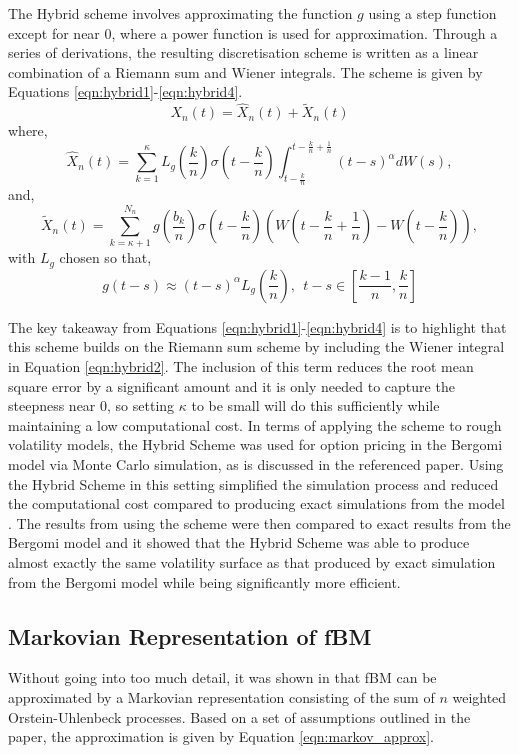 \documentclass[12pt,oneside]{article}
\begin{document}
The Hybrid scheme involves approximating the function $g$ using a step function except for near 0, where a power function is used for approximation. Through a series of derivations, the resulting discretisation scheme is written as a linear combination of a Riemann sum and Wiener integrals. The scheme is given by Equations
\ref{eqn:hybrid1}-\ref{eqn:hybrid4}.  
\begin{equation}
\label{eqn:hybrid1}
X_n(t) = \hat{X}_n(t) + \tilde{X}_n(t)
\end{equation}
where,
\begin{equation}
\label{eqn:hybrid2}
\hat{X}_n(t) = \sum_{k=1}^{\kappa} L_g(\frac{k}{n}) \sigma (t-\frac{k}{n}) \int_{t-\frac{k}{n}}^{t-\frac{k}{n}+\frac{1}{n}}(t-s)^\alpha dW(s),
\end{equation}
and,
\begin{equation}
\label{eqn:hybrid3}
\tilde{X}_n(t)=\sum_{k=\kappa+1}^{N_n}g(\frac{b_k}{n})\sigma(t-\frac{k}{n})(W(t-\frac{k}{n}+\frac{1}{n})-W(t-\frac{k}{n})),
\end{equation}
with $L_g$ chosen so that,
\begin{equation}
\label{eqn:hybrid4}
g(t-s) \approx (t-s)^\alpha L_g(\frac{k}{n}), \ \ t-s \in [\frac{k-1}{n},\frac{k}{n}]
\end{equation}

The key takeaway from Equations \ref{eqn:hybrid1}-\ref{eqn:hybrid4} is to highlight that this scheme builds on the Riemann sum scheme by including the Wiener integral in Equation \ref{eqn:hybrid2}. The inclusion of this term reduces the root mean square error by a significant amount and it is only needed to capture the steepness near 0, so setting $\kappa$ to be small will do this sufficiently while maintaining a low computational cost. In terms of applying the scheme to rough volatility models, the Hybrid Scheme was used for option pricing in the Bergomi model via Monte Carlo simulation, as is discussed in the referenced paper. Using the Hybrid Scheme in this setting simplified the simulation process and reduced the computational cost compared to producing exact simulations from the model \cite[Page~20]{Bennedsen2017}. The results from using the scheme were then compared to exact results from the Bergomi model and it showed that the Hybrid Scheme was able to produce almost exactly the same volatility surface as that produced by exact simulation from the Bergomi model while being significantly more efficient.

\subsection{Markovian Representation of fBM}
\label{subsec:markovian_rep_fBm}
Without going into too much detail, it was shown in \cite{Harms2020} that fBM can be approximated by a Markovian representation consisting of the sum of $n$ weighted Orstein-Uhlenbeck processes. Based on a set of assumptions outlined in the paper, the approximation is given by Equation \ref{eqn:markov_approx}.
\end{document}
